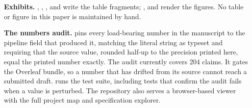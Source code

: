 \textbf{Exhibits.} ,
, ,
 and  write
the table fragments; ,
 and  render the
figures. No table or figure in this paper is maintained by hand.

\textbf{The numbers audit.}  pins every
load-bearing number in the manuscript to the pipeline field that produced
it, matching the literal string as typeset and requiring that the source
value, rounded half-up to the precision printed here, equal the printed
number exactly. The audit currently covers 204 claims. It gates the
Overleaf bundle, so a number that has drifted from its source cannot reach
a submitted draft.  runs the test suite,
including tests that confirm the audit fails when a value is perturbed.
The repository also serves a browser-based viewer
with the full project map and specification explorer.
